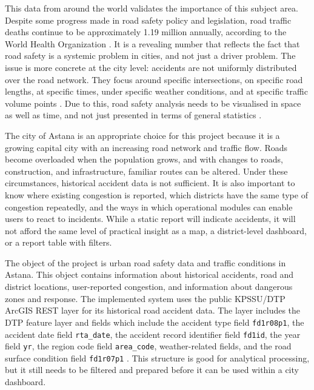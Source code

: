 ﻿\documentclass[12pt,a4paper]{report}
\begin{document}
This data from around the world validates the importance of this subject area. Despite some progress made in road safety policy and legislation, road traffic deaths continue to be approximately 1.19 million annually, according to the World Health Organization \cite{who2023}. It is a revealing number that reflects the fact that road safety is a systemic problem in cities, and not just a driver problem. The issue is more concrete at the city level: accidents are not uniformly distributed over the road network. They focus around specific intersections, on specific road lengths, at specific times, under specific weather conditions, and at specific traffic volume points \cite{ewing2009}. Due to this, road safety analysis needs to be visualised in space as well as time, and not just presented in terms of general statistics \cite{anderson2009}.

The city of Astana is an appropriate choice for this project because it is a growing capital city with an increasing road network and traffic flow. Roads become overloaded when the population grows, and with changes to roads, construction, and infrastructure, familiar routes can be altered. Under these circumstances, historical accident data is not sufficient. It is also important to know where existing congestion is reported, which districts have the same type of congestion repeatedly, and the ways in which operational modules can enable users to react to incidents. While a static report will indicate accidents, it will not afford the same level of practical insight as a map, a district-level dashboard, or a report table with filters.

The object of the project is urban road safety data and traffic conditions in Astana. This object contains information about historical accidents, road and district locations, user-reported congestion, and information about dangerous zones and response. The implemented system uses the public KPSSU/DTP ArcGIS REST layer for its historical road accident data. The layer includes the DTP feature layer and fields which include the accident type field \texttt{fd1r08p1}, the accident date field \texttt{rta\_date}, the accident record identifier field \texttt{fd1id}, the year field \texttt{yr}, the region code field \texttt{area\_code}, weather-related fields, and the road surface condition field \texttt{fd1r07p1} \cite{kpssuDtp}. This structure is good for analytical processing, but it still needs to be filtered and prepared before it can be used within a city dashboard.
\end{document}
